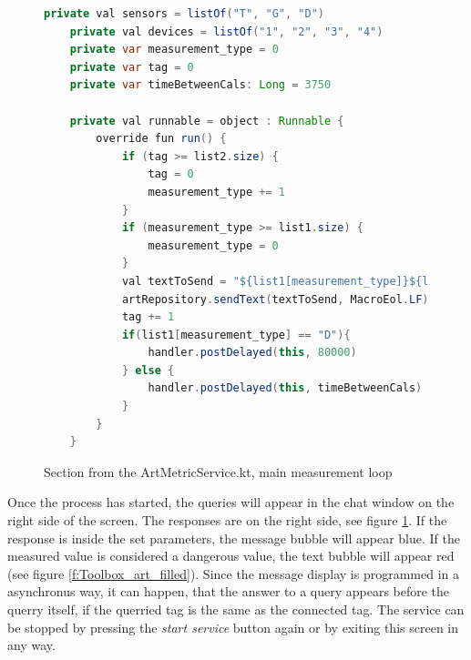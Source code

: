 \begin{figure}[h]
    \centering
    \begin{lstlisting}[language=Java]
    private val sensors = listOf("T", "G", "D")
    private val devices = listOf("1", "2", "3", "4")
    private var measurement_type = 0
    private var tag = 0
    private var timeBetweenCals: Long = 3750

    private val runnable = object : Runnable {
        override fun run() {
            if (tag >= list2.size) {
                tag = 0
                measurement_type += 1
            }
            if (measurement_type >= list1.size) {
                measurement_type = 0
            }
            val textToSend = "${list1[measurement_type]}${list2[tag]}"
            artRepository.sendText(textToSend, MacroEol.LF)
            tag += 1
            if(list1[measurement_type] == "D"){
                handler.postDelayed(this, 80000)
            } else {
                handler.postDelayed(this, timeBetweenCals)
            }
        }
    }
    \end{lstlisting}
    \caption{Section from the ArtMetricService.kt, main measurement loop}
	\label{code:App_main_loop}
\end{figure}

Once the process has started, the queries will appear in the chat window on the right side of the screen.
The responses are on the right side, see figure \ref{code:App_main_loop}.
If the response is inside the set parameters, the message bubble will appear blue.
If the measured value is considered a dangerous value, the text bubble will appear red (see figure \ref{f:Toolbox_art_filled}).
Since the message display is programmed in a asynchronus way, it can happen, that the answer to a query appears before the querry itself, if the querried tag is the same as the connected tag.
The service can be stopped by pressing the \textit{start service} button again or by exiting this screen in any way.


